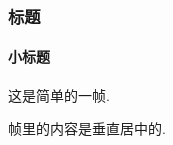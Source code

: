 \documentclass[nofonts]{beamer}
\begin{document}
\begin{frame}
	\frametitle{标题}
	\framesubtitle{小标题}
	这是简单的一帧.

	帧里的内容是垂直居中的.
\end{frame}
\end{document}
